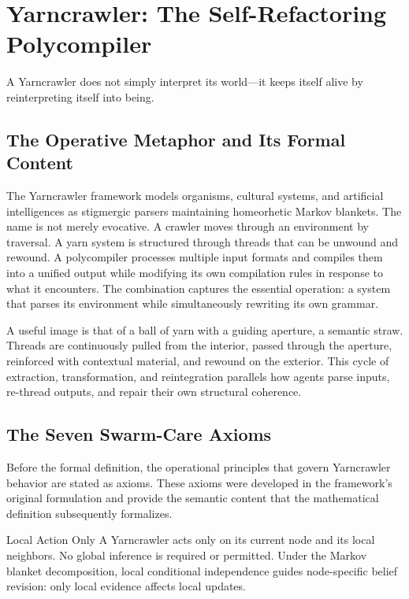\chapter{Yarncrawler: The Self-Refactoring Polycompiler}
\label{ch:yarncrawler_formal}

\epigraph{A Yarncrawler does not simply interpret its world---it keeps itself alive
by reinterpreting itself into being.}{}

\section{The Operative Metaphor and Its Formal Content}

The Yarncrawler framework models organisms, cultural systems, and artificial
intelligences as stigmergic parsers maintaining homeorhetic Markov blankets. The
name is not merely evocative. A crawler moves through an environment by traversal.
A yarn system is structured through threads that can be unwound and rewound. A
polycompiler processes multiple input formats and compiles them into a unified
output while modifying its own compilation rules in response to what it encounters.
The combination captures the essential operation: a system that parses its
environment while simultaneously rewriting its own grammar.

A useful image is that of a ball of yarn with a guiding aperture, a semantic straw.
Threads are continuously pulled from the interior, passed through the aperture, reinforced
with contextual material, and rewound on the exterior. This cycle of extraction,
transformation, and reintegration parallels how agents parse inputs, re-thread
outputs, and repair their own structural coherence.

\section{The Seven Swarm-Care Axioms}

Before the formal definition, the operational principles that govern Yarncrawler
behavior are stated as axioms. These axioms were developed in the framework's
original formulation and provide the semantic content that the mathematical
definition subsequently formalizes.

\begin{axiom}{Local Action Only}
A Yarncrawler acts only on its current node and its local neighbors. No global
inference is required or permitted. Under the Markov blanket decomposition, local
conditional independence guides node-specific belief revision: only local evidence
affects local updates.
\end{axiom}

